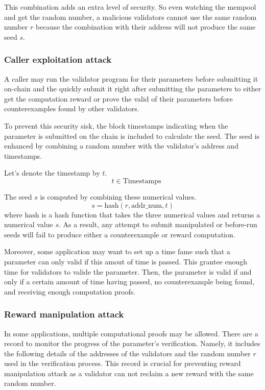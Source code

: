 \documentclass[runningheads]{llncs}
\begin{document}
This combination adds an extra level of security. So even watching the mempool and get the random number, a malicious validators cannot use the same random number $r$  because the combination with their address will not produce the same seed $s$.
\subsubsection{Caller exploitation attack}
A caller may run the validator program for their parameters before submitting it on-chain and the quickly submit it right after submitting the parameters to either get the computation reward or prove the valid of their parameters before  counterexamples found by other validators. 

To prevent this security sisk, the block timestamps indicating when the parameter is submitted on the chain is included to calculate the seed. The seed is enhanced by combining a random number with the validator's address and timestamps.

 Let's denote the timestamp by $t$.
\begin{equation}
\quad t \in \text{Timestamps}
\end{equation}

The seed $s$ is computed by combining these numerical values.
\begin{equation}
s = \text{hash}(r, \text{addr\_num}, t)
\end{equation}
where \(\text{hash}\) is a hash function that takes the three numerical values and returns a numerical value \( s \).
As a result, any attempt to submit manipulated or before-run seeds will fail to produce either a counterexample or reward computation.


Moreover, some application may want to set up a time fame such that a parameter can only valid if this amout of time is passed. This grantee enough time for validators to valide the parameter. Then, the parameter is valid if and only if a certain amount of time having passed, no counterexample being found, and receiving enough computation proofs. 
\subsubsection{Reward manipulation attack}
In some applications, multiple computational proofs may be allowed. There are a record to monitor the progress of the parameter's verification. Namely, it includes the following details of the addresses of the validators and the random number $r$ used in the verification process. This record is crucial for preventing reward manipulation attack as a validator can not reclaim a new reward with the same random number. 
\end{document}
